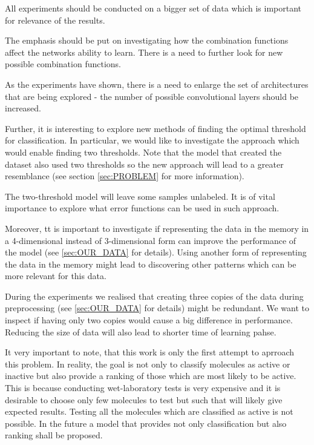 \documentclass[a4paper,10pt]{report}
\begin{document}
      All experiments should be conducted on a bigger set of data which is important for relevance of the results.
      
      The emphasis should be put on investigating how the combination functions affect the networks ability to learn. There is a need to further look for new possible combination functions.
      
      As the experiments have shown, there is a need to enlarge the set of architectures that are being explored - the number of possible convolutional layers should be increased.
      
      Further, it is interesting to explore new methods of finding the optimal threshold for classification. In particular, we would like to investigate the approach which would enable finding two thresholds. Note that the model that created the dataset also used two thresholds so the new approach will lead to a greater resemblance (see section \ref{sec:PROBLEM} for more information). 
      
      The two-threshold model will leave some samples unlabeled. It is of vital importance to explore what error functions can be used in such approach.

      Moreover, tt is important to investigate if representing the data in the memory in a 4-dimensional instead of 3-dimensional form can improve the performance of the model (see \ref{sec:OUR_DATA} for details). Using another form of representing the data in the memory might lead to discovering other patterns which can be more relevant for this data.
      
      During the experiments we realised that creating three copies of the data during preprocessing (see \ref{sec:OUR_DATA} for details) might be redundant. We want to inspect if having only two copies would cause a big difference in performance. Reducing the size of data will also lead to shorter time of learning pahse.
      
      It very important to note, that this work is only the first attempt to aprroach this problem. In reality, the goal is not only to classify molecules as active or inactive but also provide a ranking of those which are most likely to be active. This is because conducting wet-laboratory tests is very expensive and it is desirable to choose only few molecules to test but such that will likely give expected results. Testing all the molecules which are classified as active is not possible. In the future a model that provides not only classification but also ranking shall be proposed.
      
\end{document}
